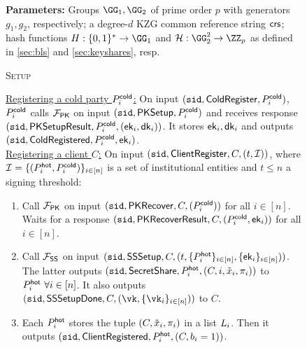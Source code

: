 \begin{figure*}
        \centering
        \begin{mdframed}
        \textbf{Parameters:} Groups $\GG_1, \GG_2$ of prime order $p$ with generators $g_1, g_2$, respectively; a degree-$d$ KZG common reference string $\mathsf{crs}$; hash functions $\blshash: \{0,1\}^* \to \GG_1$ and $\lhlhash: \GG_2^2 \to \ZZ_p$ as defined in \ref{sec:bls} and \ref{sec:keyshares}, resp.
        \begin{center}
            \textsc{Setup}
        \end{center}
        \underline{Registering a cold party $P_i^{\mathsf{cold}}$:} On input $(\texttt{sid}, \mathsf{ColdRegister}, P_i^{\mathsf{cold}})$, $P_i^{\mathsf{cold}}$ calls $\mathcal{F}_\mathsf{PK}$ on input $(\texttt{sid}, \mathsf{PKSetup}, P_i^{\mathsf{cold}})$ and receives response $(\texttt{sid},\allowbreak \mathsf{PKSetupResult}, P_i^{\mathsf{cold}}, (\mathsf{ek}_i, \mathsf{dk}_i))$. It stores $\mathsf{ek}_i, \mathsf{dk}_i$ and outputs $(\texttt{sid},\allowbreak \mathsf{ColdRegistered}, P_i^{\mathsf{cold}}, \mathsf{ek}_i)$.
        \hfill\medskip\\
        \underline{Registering a client $C$:} On input $(\texttt{sid}, \mathsf{ClientRegister}, C, (t, \mathcal{I}))$, where $\mathcal{I} = \{(P_i^{\mathsf{hot}}, P_i^{\mathsf{cold}})\}_{i \in [n]}$ is a set of institutional entities
        and $t \leq n$ a signing threshold:
        \begin{enumerate}
            \item Call $\mathcal{F}_\mathsf{PK}$ on input $(\texttt{sid}, \mathsf{PKRecover}, C, (P_i^{\mathsf{cold}}))$ for all $i \in [n]$. Waits for a response $(\texttt{sid}, \mathsf{PKRecoverResult}, C, (P_i^{\mathsf{cold}}, \mathsf{ek}_i))$ for all $i \in [n]$.
            \item Call $\mathcal{F}_\mathsf{SS}$ on input $(\texttt{sid}, \mathsf{SSSetup}, C, (t, \{P_i^{\mathsf{hot}}\}_{i \in [n]}, \{\mathsf{ek}_i\}_{i \in [n]}))$. The latter outputs $(\texttt{sid},\allowbreak \mathsf{SecretShare},\allowbreak P_i^{\mathsf{hot}}, (C, i, \tilde{x}_i, \pi_i))$ to $P_i^{\mathsf{hot}} ~\forall i \in [n]$. It also outputs $(\sid, \mathsf{SSSetupDone}, C,\allowbreak (\vk, \{\vk_i\}_{i \in [n]}))$ to $C$.
            \item Each $P_i^{\mathsf{hot}}$ 
            stores the tuple $(C, \tilde{x}_i, \pi_i)$ in a list $L_i$. Then it outputs $(\texttt{sid}, \mathsf{ClientRegistered}, P_i^{\mathsf{hot}},\allowbreak (C, b_i = 1))$.

\end{enumerate}
\end{mdframed}
\end{figure*}
